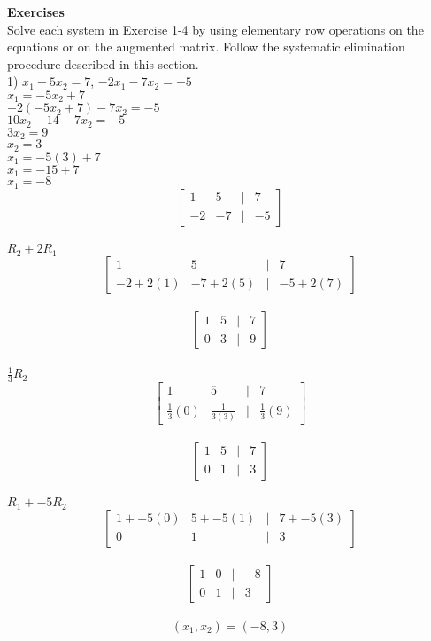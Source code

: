 \documentclass[]{article}
\begin{document}
\textbf{Exercises}\\
Solve each system in Exercise 1-4 by using elementary row operations on the equations or on the augmented matrix. Follow the systematic elimination procedure described in this section.\\

1) $x_1 + 5x_2 = 7$, $-2x_1 - 7x_2 = -5$\\
$x_1 = -5x_2 + 7$\\
$-2(-5x_2 + 7) - 7x_2 = -5$\\
$10x_2 - 14 - 7x_2 = -5$\\
$3x_2 = 9$\\
$x_2 = 3$\\
$x_1 = -5(3) + 7$\\
$x_1 = -15 + 7$\\
$x_1 = -8$\\
\[
\begin{bmatrix}
	1 & 5 & | & 7 \\
	-2 & -7& | & -5
\end{bmatrix}
\]\\
$R_2 + 2R_1$\\
\[
\begin{bmatrix}
	1 & 5 & | & 7 \\
	-2+2(1) & -7+2(5) & | & -5+2(7)
\end{bmatrix}
\]\\
\[
\begin{bmatrix}
	1 & 5 & | & 7 \\
	0 & 3 & | & 9
\end{bmatrix}
\]\\
$\frac{1}{3}R_2$\\
\[
\begin{bmatrix}
	1 & 5 & | & 7 \\
	\frac{1}{3}(0) & \frac{1}{3(3)} & | & \frac{1}{3}(9)
\end{bmatrix}
\]\\
\[
\begin{bmatrix}
	1 & 5 & | & 7 \\
	0 & 1 & | & 3
\end{bmatrix}
\]\\
$R_1 + -5R_2$\\
\[
\begin{bmatrix}
	1 + -5(0) & 5 + -5(1) & | & 7 + -5(3) \\
	0 & 1 & | & 3
\end{bmatrix}
\]\\
\[
\begin{bmatrix}
	1 & 0 & | & -8 \\
	0 & 1 & | & 3
\end{bmatrix}
\]\\
$$(x_1,x_2) = (-8,3)$$\\
\end{document}
